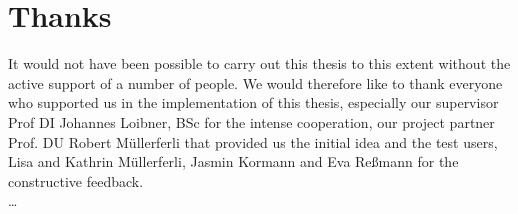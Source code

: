 \section*{Thanks}
It would not have been possible to carry out this thesis to this extent without the active support of a number of people. We would therefore like to thank everyone who supported us in the implementation of this thesis, especially our supervisor Prof DI Johannes Loibner, BSc for the intense cooperation, our project partner Prof. DU Robert Müllerferli that provided us the initial idea and the test users, Lisa and Kathrin Müllerferli, Jasmin Kormann and Eva Reßmann for the constructive feedback.\\
\dots